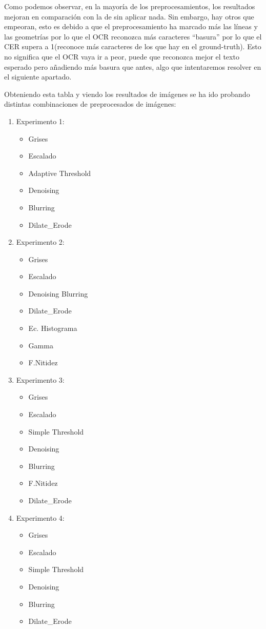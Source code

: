 Como podemos observar, en la mayoría de los preprocesamientos, los resultados mejoran en comparación con la de sin aplicar nada. Sin embargo, hay otros que empeoran, esto es debido a que el preprocesamiento ha marcado más las líneas y las geometrías por lo que el OCR reconozca más caracteres ``basura'' por lo que el CER supera a 1(reconoce más caracteres de los que hay en el ground-truth). Esto no significa que el OCR vaya ir a peor, puede que reconozca mejor el texto esperado pero añadiendo más basura que antes, algo que intentaremos resolver en el siguiente apartado. 

Obteniendo esta tabla y viendo los resultados de imágenes se ha ido probando distintas combinaciones de preprocesados de imágenes:
\begin{enumerate}
	\item Experimento 1: 
	\begin{itemize}
		\item Grises \item Escalado\item Adaptive Threshold \item Denoising \item Blurring \item Dilate\_Erode    
	\end{itemize}
		\item Experimento 2: 
	\begin{itemize}
		\item Grises\item Escalado\item Denoising Blurring  \item Dilate\_Erode\item Ec. Histograma \item Gamma \item F.Nitidez           
	\end{itemize}
		\item Experimento 3: 
	\begin{itemize}
		\item Grises \item Escalado\item Simple Threshold \item Denoising \item Blurring \item F.Nitidez \item Dilate\_Erode    
	\end{itemize}
		\item Experimento 4: 
	\begin{itemize}
		\item Grises \item Escalado\item Simple Threshold \item Denoising \item Blurring \item Dilate\_Erode    
	\end{itemize}
\end{enumerate}
